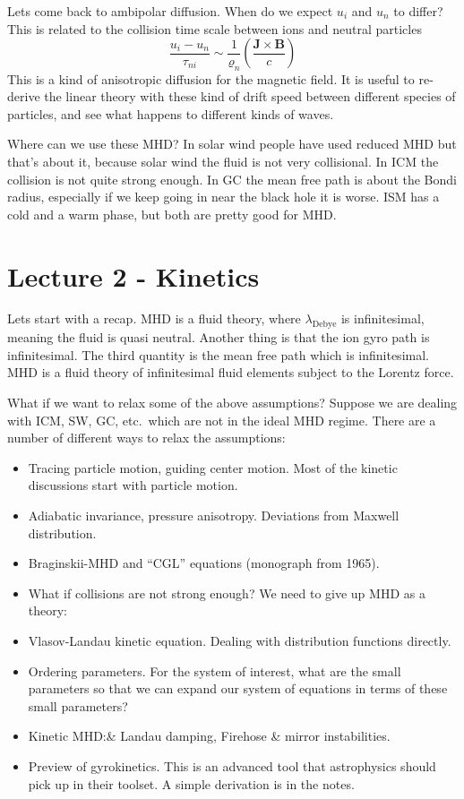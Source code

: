 \documentclass[letterpaper, 11pt]{article}
\numberwithin{equation}{section}
\numberwithin{figure}{section}
\begin{document}
Lets come back to ambipolar diffusion. When do we expect $u_i$ and $u_n$ to
differ? This is related to the collision time scale between ions and neutral
particles
\begin{equation}
  \label{eq:21}
  \frac{u_i - u_n}{\tau_{ni}} \sim \frac{1}{\varrho_n}\left( \frac{\mathbf{J}\times \mathbf{B}}{c} \right)
\end{equation}
This is a kind of anisotropic diffusion for the magnetic field. It is useful to
re-derive the linear theory with these kind of drift speed between different
species of particles, and see what happens to different kinds of waves.

Where can we use these MHD? In solar wind people have used reduced MHD but
that's about it, because solar wind the fluid is not very collisional. In ICM
the collision is not quite strong enough. In GC the mean free path is about the
Bondi radius, especially if we keep going in near the black hole it is worse.
ISM has a cold and a warm phase, but both are pretty good for MHD.

\section{Lecture 2 - Kinetics}
\label{sec:lec2}

Lets start with a recap. MHD is a fluid theory, where $\lambda_\mathrm{Debye}$
is infinitesimal, meaning the fluid is quasi neutral. Another thing is that the
ion gyro path is infinitesimal. The third quantity is the mean free path which
is infinitesimal. MHD is a fluid theory of infinitesimal fluid elements subject
to the Lorentz force.

What if we want to relax some of the above assumptions? Suppose we are dealing
with ICM, SW, GC, etc.\ which are not in the ideal MHD regime. There are a
number of different ways to relax the assumptions:
\begin{itemize}
    \item Tracing particle motion, guiding center motion. Most of the kinetic
      discussions start with particle motion.
    \item Adiabatic invariance, pressure anisotropy. Deviations from Maxwell distribution.
    \item Braginskii-MHD and ``CGL'' equations (monograph from 1965).
    \item What if collisions are not strong enough? We need to give up MHD as a theory:
    \item Vlasov-Landau kinetic equation. Dealing with distribution functions directly.
    \item Ordering parameters. For the system of interest, what are the small
      parameters so that we can expand our system of equations in terms of these
      small parameters?
    \item Kinetic MHD:\@Barnes \& Landau damping, Firehose \& mirror instabilities.
    \item Preview of gyrokinetics. This is an advanced tool that astrophysics
      should pick up in their toolset. A simple derivation is in the notes.
\end{itemize}
\end{document}
